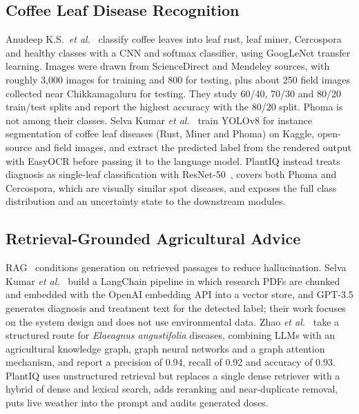 \subsection{Coffee Leaf Disease Recognition}
Anudeep K.S.\ \textit{et al.}~\cite{anudeep2024cnn} classify coffee leaves into leaf rust, leaf miner, Cercospora and
healthy classes with a CNN and softmax classifier, using GoogLeNet transfer learning. Images were drawn from
ScienceDirect and Mendeley sources, with roughly 3{,}000 images for training and 800 for testing, plus about 250 field
images collected near Chikkamagaluru for testing. They study 60/40, 70/30 and 80/20 train/test splits and report the
highest accuracy with the 80/20 split. Phoma is not among their classes. Selva Kumar \textit{et al.}~\cite{selvakumar2024rag}
train YOLOv8 for instance segmentation of coffee leaf diseases (Rust, Miner and Phoma) on Kaggle, open-source and field
images, and extract the predicted label from the rendered output with EasyOCR before passing it to the language model.
PlantIQ instead treats diagnosis as single-leaf classification with ResNet-50~\cite{he2016resnet}, covers both Phoma and
Cercospora, which are visually similar spot diseases, and exposes the full class distribution and an uncertainty state to
the downstream modules.

\subsection{Retrieval-Grounded Agricultural Advice}
RAG~\cite{lewis2020rag} conditions generation on retrieved passages to reduce hallucination. Selva Kumar
\textit{et al.}~\cite{selvakumar2024rag} build a LangChain pipeline in which research PDFs are chunked and embedded with
the OpenAI embedding API into a vector store, and GPT-3.5 generates diagnosis and treatment text for the detected label;
their work focuses on the system design and does not use environmental data. Zhao \textit{et al.}~\cite{zhao2024kg}
take a structured route for \textit{Elaeagnus angustifolia} diseases, combining LLMs with an agricultural knowledge
graph, graph neural networks and a graph attention mechanism, and report a precision of 0.94, recall of 0.92 and
accuracy of 0.93. PlantIQ uses unstructured retrieval but replaces a single dense retriever with a hybrid of dense and
lexical search, adds reranking and near-duplicate removal, puts live weather into the prompt and audits generated doses.

